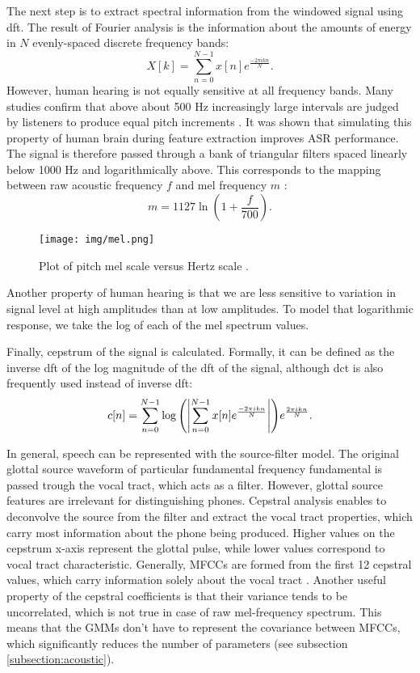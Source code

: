 The next step is to extract spectral information from the windowed signal using \gls{dft}. The result of Fourier analysis is the information about the amounts of energy in $N$ evenly-spaced discrete frequency bands:
\begin{equation}
  X[k]=\sum_{n=0}^{N-1}x[n]e^{\frac{-2\pi ikn}{N}}.
\end{equation}
However, human hearing is not equally sensitive at all frequency bands. Many studies confirm that above about 500 Hz increasingly large intervals are judged by listeners to produce equal pitch increments \cite{stevens1937scale, fletcher1938loudness}. It was shown that simulating this property of human brain during feature extraction improves ASR performance. The signal is therefore passed through a bank of triangular filters spaced linearly below 1000 Hz and logarithmically above. This corresponds to the mapping between raw acoustic frequency $f$ and mel frequency $m$ \cite{muda2010voice}:
\begin{equation}
  m=1127\ln(1+\frac{f}{700}).
\end{equation}

\begin{figure}[!ht]
  \centering
  \texttt{[image: img/mel.png]}
  \caption{Plot of pitch mel scale versus Hertz scale \cite{vedala2008mel}.}
  \label{figure:mel}
\end{figure}

Another property of human hearing is that we are less sensitive to variation in signal level at high amplitudes than at low amplitudes. To model that logarithmic response, we take the log of each of the mel spectrum values.

Finally, cepstrum of the signal is calculated. Formally, it can be defined as the inverse \gls{dft} of the log magnitude of the \gls{dft} of the signal, although \gls{dct} is also frequently used instead of inverse \gls{dft}:
\begin{equation}
  \label{equation:cepstrum}
  c[n]=\sum_{n=0}^{N-1}\log{\left(\left|\sum_{n=0}^{N-1}x[n]e^{\frac{-2\pi ikn}{N}}\right|\right)}e^{\frac{2\pi ikn}{N}}.
\end{equation}

In general, speech can be represented with the source-filter model. The original glottal source waveform of particular fundamental frequency \gls{fundamental} is passed trough the vocal tract, which acts as a filter. However, glottal source features are irrelevant for distinguishing phones. Cepstral analysis enables to deconvolve the source from the filter and extract the vocal tract properties, which carry most information about the phone being produced. Higher values on the cepstrum x-axis represent the glottal pulse, while lower values correspond to vocal tract characteristic. Generally, MFCCs are formed from the first 12 cepstral values, which carry information solely about the vocal tract  \cite{jurafsky2000speech}. Another useful property of the cepstral coefficients is that their variance tends to be uncorrelated, which is not true in case of raw mel-frequency spectrum. This means that the GMMs don't have to represent the covariance between MFCCs, which significantly reduces the number of parameters (see subsection \ref{subsection:acoustic}).

